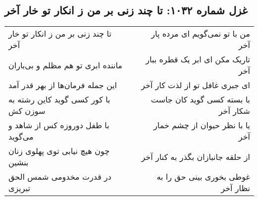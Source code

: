 \begin{center}
\section*{غزل شماره ۱۰۳۲: تا چند زنی بر من ز انکار تو خار آخر}
\label{sec:1032}
\begin{longtable}{l p{0.5cm} r}
تا چند زنی بر من ز انکار تو خار آخر
&&
من با تو نمی‌گویم ای مرده پار آخر
\\
ماننده ابری تو هم مظلم و بی‌باران
&&
تاریک مکن ای ابر یک قطره ببار آخر
\\
این جمله فرمان‌ها از بهر قدر آمد
&&
ای جبری غافل تو از لذت کار آخر
\\
با کور کسی گوید کاین رشته به سوزن کش
&&
با بسته کسی گوید کان جاست شکار آخر
\\
با طفل دوروزه کس از شاهد و می‌گوید
&&
یا با نظر حیوان از چشم خمار آخر
\\
چون هیچ نیابی توی پهلوی زنان بنشین
&&
از حلقه جانبازان بگذر به کنار آخر
\\
در قدرت مخدومی شمس الحق تبریزی
&&
غوطی بخوری بینی حق را به نظار آخر
\\
\end{longtable}
\end{center}
